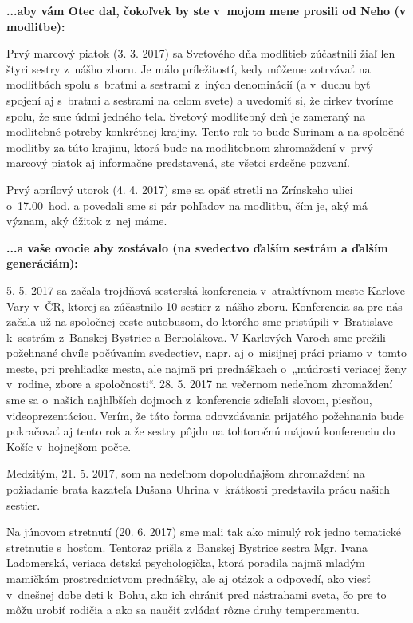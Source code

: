 {\bf ...aby vám Otec dal, čokoľvek by ste v~mojom mene prosili od Neho (v modlitbe):}

Prvý marcový piatok (3. 3. 2017) sa Svetového dňa modlitieb zúčastnili žiaľ len štyri sestry z~nášho zboru. Je málo príležitostí, kedy môžeme zotrvávať na modlitbách spolu s~bratmi a sestrami z~iných denominácií (a v~duchu byť spojení aj s~bratmi a sestrami na celom svete) a uvedomiť si, že cirkev tvoríme spolu, že sme údmi jedného tela. Svetový modlitebný deň je zameraný na modlitebné potreby konkrétnej krajiny. Tento rok to bude Surinam a na spoločné modlitby za túto krajinu, ktorá bude na modlitebnom zhromaždení v~prvý marcový piatok aj informačne predstavená, ste všetci srdečne pozvaní.

Prvý aprílový utorok (4. 4. 2017) sme sa opäť stretli na Zrínskeho ulici o~17.00~hod. a povedali sme si pár pohľadov na modlitbu, čím je, aký má význam, aký úžitok z~nej máme.

{\bf ...a vaše ovocie aby zostávalo (na svedectvo ďalším sestrám a ďalším generáciám):}

5. 5. 2017 sa začala trojdňová sesterská konferencia v~atraktívnom meste Karlove Vary v~ČR, ktorej sa zúčastnilo 10 sestier z~nášho zboru. Konferencia sa pre nás začala už na spoločnej ceste autobusom, do ktorého sme pristúpili v~Bratislave k~sestrám z~Banskej Bystrice a Bernolákova. V Karlových Varoch sme prežili požehnané chvíle počúvaním svedectiev, napr. aj o~misijnej práci priamo v~tomto meste, pri prehliadke mesta, ale najmä pri prednáškach o~„múdrosti veriacej ženy v~rodine, zbore a spoločnosti“. 28. 5. 2017 na večernom nedeľnom zhromaždení sme sa o~našich najhlbších dojmoch z~konferencie zdieľali slovom, piesňou, videoprezentáciou. Verím, že táto forma odovzdávania prijatého požehnania bude pokračovať aj tento rok a že sestry pôjdu na tohtoročnú májovú konferenciu do Košíc v~hojnejšom počte.

Medzitým, 21. 5. 2017, som na nedeľnom dopoludňajšom zhromaždení na požiadanie brata kazateľa Dušana Uhrina v~krátkosti predstavila prácu našich sestier.

Na júnovom stretnutí (20. 6. 2017) sme mali tak ako minulý rok jedno tematické stretnutie s~hosťom. Tentoraz prišla z~Banskej Bystrice sestra Mgr. Ivana Ladomerská, veriaca detská psychologička, ktorá poradila najmä mladým mamičkám prostredníctvom prednášky, ale aj otázok a odpovedí, ako viesť v~dnešnej dobe deti k~Bohu, ako ich chrániť pred nástrahami sveta, čo pre to môžu urobiť rodičia a ako sa naučiť zvládať rôzne druhy temperamentu.

